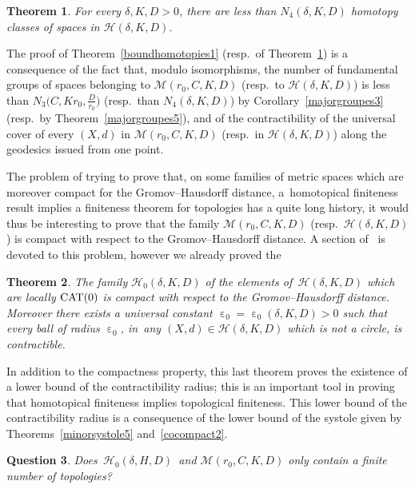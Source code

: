 \documentclass[10pt,a4paper]{amsart}
\providecommand{\cal}{\mathcal}
\numberwithin{equation}{section}
\newtheorem{theor}{Theorem}[section]
\newtheorem{question}[theor]{Question}
\newcommand{\e}{\operatorname{\varepsilon}}
\begin{document}
\begin{theor}\label{boundhomotopies2}
For every $ \delta, K, D >0$, there are less than $N_4 \left(\delta, K,
D \right)$ homotopy classes of
spaces in ${\cal H} (\delta, K, D)$.
\end{theor}

The proof of Theorem~\ref{boundhomotopies1} (resp.\ of Theorem~\ref{boundhomotopies2}) is a consequence of the fact that, modulo isomorphisms,
the number of fundamental groups of spaces belonging to ${\cal M} (r_0, C, K, D)$ (resp.\ to ${\cal H} (\delta, K, D)$) is less than $N_3 \big(C, K r_0, \frac{D}{r_0}\big)$ (resp.\ than
$N_4 (\delta, K, D)$) by Corollary~\ref{majorgroupes3} (resp.\ by Theorem~\ref{majorgroupes5}), and of the contractibility of the universal cover
of every $(X,d)$ in ${\cal M} (r_0, C, K, D)$ (resp.\ in ${\cal H} (\delta, K, D)$) along the geodesics issued from one point.

\medskip

The problem of trying to prove that, on some families of metric spaces which are moreover compact for the Gromov--Hausdorff distance, a~homotopical
finiteness result implies a finiteness theorem for topologies has a quite
long history, it would thus be interesting to prove that
the family ${\cal M} (r_0, C, K, D)$ (resp.\ ${\cal H} (\delta, K, D)$) is compact with respect to the Gromov--Hausdorff distance. A section of~\cite{BCGS2} is devoted to this problem, however we already proved the

\begin{theor}\label{GHcompactness}
The family ${\cal H}_0 (\delta, K, D)$ of the elements of~${\cal H} (\delta, K, D)$ which are locally ${\rm CAT}(0)$ is compact with respect to the Gromov--Hausdorff distance.
Moreover there exists a universal constant $\e_0 = \e_0 (\delta, K, D)
> 0$ such that every ball of radius $\e_0$, in~any $(X,d) \in {\cal H} (\delta, K, D)$
which is not a circle, is contractible.
\end{theor}

In addition to the compactness property, this last theorem proves the existence of a lower bound of the contractibility radius; this is an important tool in
proving that homotopical finiteness implies topological finiteness. This lower bound of the contractibility radius is a consequence of the lower bound of the systole
given by Theorems~\ref{minorsystole5} and~\ref{cocompact2}.

\begin{question}
Does $\,{\cal H}_{0} (\delta,H,D)\,$ and ${\cal M} (r_0, C, K, D)$ only contain a finite number of topo\-logies?
\end{question}
\end{document}
